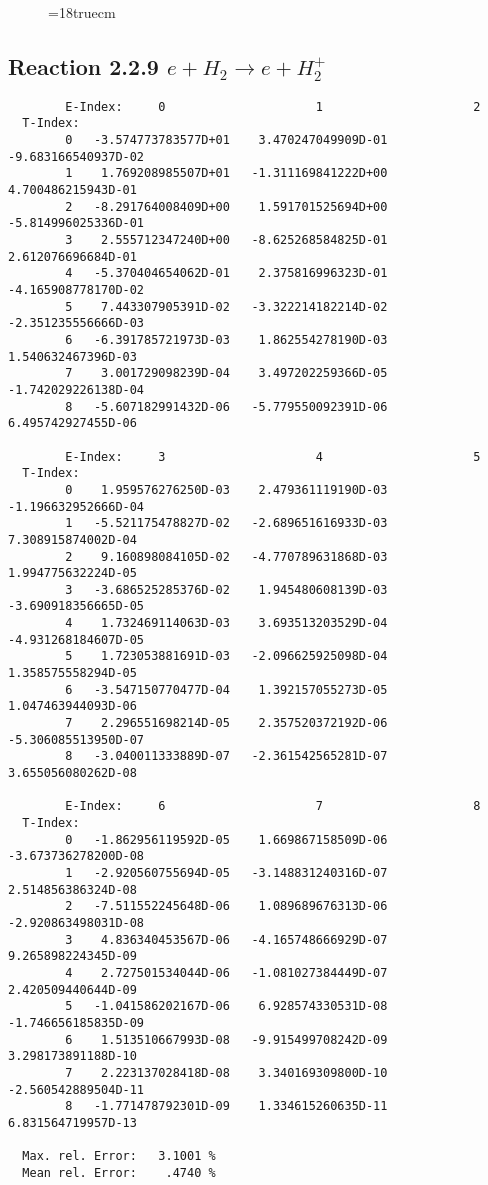 \begin{figure} \label{2.2.5g}
\epsfxsize=18truecm
\end{figure}
\newpage


\subsection{
Reaction 2.2.9  $  e + H_2       \rightarrow e + H_2^+  $
}



\begin{verbatim}
        E-Index:     0                     1                     2
  T-Index:
        0   -3.574773783577D+01    3.470247049909D-01   -9.683166540937D-02
        1    1.769208985507D+01   -1.311169841222D+00    4.700486215943D-01
        2   -8.291764008409D+00    1.591701525694D+00   -5.814996025336D-01
        3    2.555712347240D+00   -8.625268584825D-01    2.612076696684D-01
        4   -5.370404654062D-01    2.375816996323D-01   -4.165908778170D-02
        5    7.443307905391D-02   -3.322214182214D-02   -2.351235556666D-03
        6   -6.391785721973D-03    1.862554278190D-03    1.540632467396D-03
        7    3.001729098239D-04    3.497202259366D-05   -1.742029226138D-04
        8   -5.607182991432D-06   -5.779550092391D-06    6.495742927455D-06

        E-Index:     3                     4                     5
  T-Index:
        0    1.959576276250D-03    2.479361119190D-03   -1.196632952666D-04
        1   -5.521175478827D-02   -2.689651616933D-03    7.308915874002D-04
        2    9.160898084105D-02   -4.770789631868D-03    1.994775632224D-05
        3   -3.686525285376D-02    1.945480608139D-03   -3.690918356665D-05
        4    1.732469114063D-03    3.693513203529D-04   -4.931268184607D-05
        5    1.723053881691D-03   -2.096625925098D-04    1.358575558294D-05
        6   -3.547150770477D-04    1.392157055273D-05    1.047463944093D-06
        7    2.296551698214D-05    2.357520372192D-06   -5.306085513950D-07
        8   -3.040011333889D-07   -2.361542565281D-07    3.655056080262D-08

        E-Index:     6                     7                     8
  T-Index:
        0   -1.862956119592D-05    1.669867158509D-06   -3.673736278200D-08
        1   -2.920560755694D-05   -3.148831240316D-07    2.514856386324D-08
        2   -7.511552245648D-06    1.089689676313D-06   -2.920863498031D-08
        3    4.836340453567D-06   -4.165748666929D-07    9.265898224345D-09
        4    2.727501534044D-06   -1.081027384449D-07    2.420509440644D-09
        5   -1.041586202167D-06    6.928574330531D-08   -1.746656185835D-09
        6    1.513510667993D-08   -9.915499708242D-09    3.298173891188D-10
        7    2.223137028418D-08    3.340169309800D-10   -2.560542889504D-11
        8   -1.771478792301D-09    1.334615260635D-11    6.831564719957D-13

  Max. rel. Error:   3.1001 %
  Mean rel. Error:    .4740 %

\end{verbatim}
